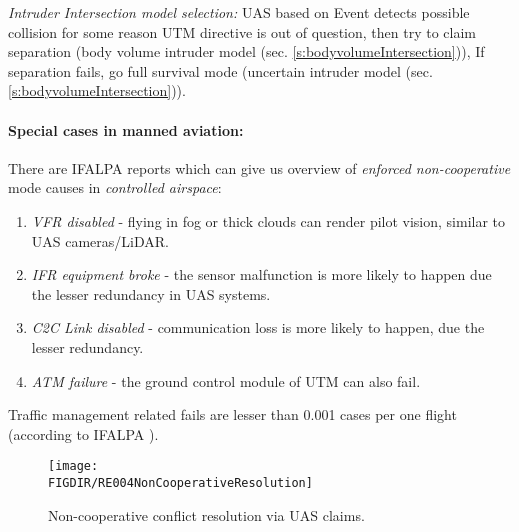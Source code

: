 \begin{note}
    \emph{Intruder Intersection model selection:} UAS based on Event detects possible collision for some reason UTM directive is out of question, then try to claim separation (body volume intruder model (sec. \ref{s:bodyvolumeIntersection})), If separation fails, go full survival mode (uncertain intruder model (sec. \ref{s:bodyvolumeIntersection})).
\end{note}

\paragraph{Special cases in manned aviation:} There are IFALPA reports which can give us overview of \emph{enforced non-cooperative} mode causes in \emph{controlled airspace}:  
\begin{enumerate}
    \item \emph{VFR disabled} - flying in fog or thick clouds can render pilot vision, similar to UAS cameras/LiDAR.
    
    \item \emph{IFR equipment broke} - the sensor malfunction is more likely to happen due the lesser redundancy in UAS systems.
    
    \item \emph{C2C Link disabled} - communication loss is more likely to happen, due the lesser redundancy.
    
    \item \emph{ATM failure} - the ground control module of UTM can also fail.
\end{enumerate}

\begin{note}
    Traffic management related fails are lesser than 0.001 cases per one flight (according to IFALPA \cite{subotic2007recovery}).
\end{note}

\begin{figure}[H]
    \centering
    \texttt{[image: \\FIGDIR/RE004NonCooperativeResolution]} 
    \caption{Non-cooperative conflict resolution via UAS claims.}
    \label{fig:NonCooperativeConflictResolutionUTM}
\end{figure}

